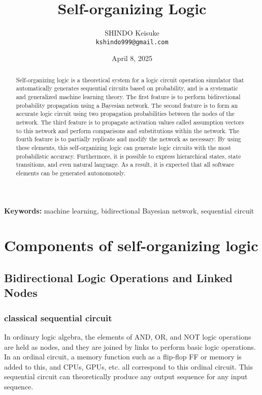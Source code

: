 \documentclass[12pt]{article}
\title{\Huge Self-organizing Logic}
\author{
    \large SHINDO Keisuke \\
    \texttt{kshindo999@gmail.com}
}
\date{April 8, 2025}
\begin{document}
\maketitle

\begin{abstract}
Self-organizing logic is a theoretical system for a logic circuit operation simulator that automatically generates sequential circuits based on probability, and is a systematic and generalized machine learning theory. The first feature is to perform bidirectional probability propagation using a Bayesian network. The second feature is to form an accurate logic circuit using two propagation probabilities between the nodes of the network. The third feature is to propagate activation values called assumption vectors to this network and perform comparisons and substitutions within the network. The fourth feature is to partially replicate and modify the network as necessary. By using these elements, this self-organizing logic can generate logic circuits with the most probabilistic accuracy. Furthermore, it is possible to express hierarchical states, state transitions, and even natural language. As a result, it is expected that all software elements can be generated autonomously.
\end{abstract}

\noindent\textbf{Keywords:} machine learning, bidirectional Bayesian network, sequential circuit

\clearpage

\tableofcontents

\clearpage


\section{Components of self-organizing logic}\label{components-of-self-organizing-logic}

\subsection{Bidirectional Logic Operations and Linked
Nodes}\label{bidirectional-logic-operations-and-linked-nodes}

\subsubsection{classical sequential circuit}\label{classical-sequential-circuit}

In ordinary logic algebra, the elements of AND, OR, and NOT logic
operations are held as nodes, and they are joined by links to perform
basic logic operations. In an ordinal circuit, a memory function such as
a flip-flop FF or memory is added to this, and CPUs, GPUs, etc. all
correspond to this ordinal circuit. This sequential circuit can
theoretically produce any output sequence for any input sequence.
\end{document}
